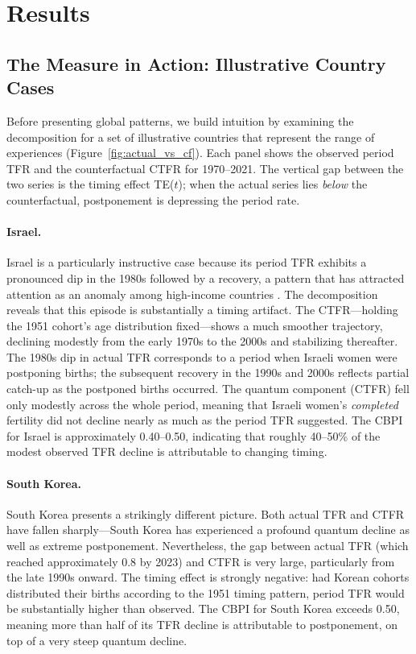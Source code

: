 \documentclass[12pt]{article}
\begin{document}
\section{Results}
\label{sec:results}

\subsection{The Measure in Action: Illustrative Country Cases}

Before presenting global patterns, we build intuition by examining the
decomposition for a set of illustrative countries that represent the
range of experiences (Figure~\ref{fig:actual_vs_cf}).  Each panel shows
the observed period TFR and the counterfactual CTFR for 1970--2021.
The vertical gap between the two series is the timing effect TE($t$);
when the actual series lies \emph{below} the counterfactual, postponement
is depressing the period rate.

\paragraph{Israel.}
Israel is a particularly instructive case because its period TFR
exhibits a pronounced dip in the 1980s followed by a recovery, a
pattern that has attracted attention as an anomaly among high-income
countries \citep{Cohen2012}.  The decomposition reveals that this
episode is substantially a timing artifact.  The CTFR---holding the
1951 cohort's age distribution fixed---shows a much smoother
trajectory, declining modestly from the early 1970s to the 2000s and
stabilizing thereafter.  The 1980s dip in actual TFR corresponds to a
period when Israeli women were postponing births; the subsequent
recovery in the 1990s and 2000s reflects partial catch-up as the
postponed births occurred.  The quantum component (CTFR) fell only
modestly across the whole period, meaning that Israeli women's
\emph{completed} fertility did not decline nearly as much as the period
TFR suggested.  The CBPI for Israel is approximately 0.40--0.50,
indicating that roughly 40--50\% of the modest observed TFR decline is
attributable to changing timing.

\paragraph{South Korea.}
South Korea presents a strikingly different picture.  Both actual TFR
and CTFR have fallen sharply---South Korea has experienced a profound
quantum decline as well as extreme postponement.  Nevertheless, the
gap between actual TFR (which reached approximately 0.8 by 2023) and
CTFR is very large, particularly from the late 1990s onward.  The
timing effect is strongly negative: had Korean cohorts distributed
their births according to the 1951 timing pattern, period TFR would be
substantially higher than observed.  The CBPI for South Korea
exceeds 0.50, meaning more than half of its TFR decline is attributable
to postponement, on top of a very steep quantum decline.
\end{document}
